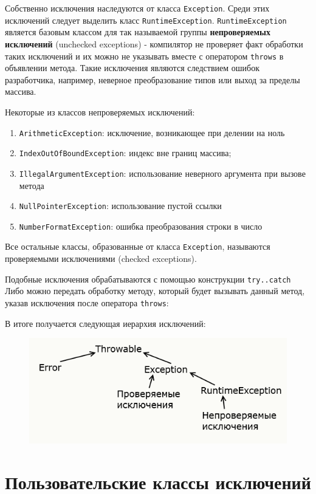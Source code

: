 \documentclass{report}
\begin{document}
Собственно исключения наследуются от класса \verb|Exception|. Среди этих исключений следует выделить класс \verb|RuntimeException|. \verb|RuntimeException| является базовым классом для так называемой группы \textbf{непроверяемых исключений} (unchecked exceptions) - компилятор не проверяет факт обработки таких исключений и их можно не указывать вместе с оператором \verb|throws| в объявлении метода. Такие исключения являются следствием ошибок разработчика, например, неверное преобразование типов или выход за пределы массива.

Некоторые из классов непроверяемых исключений:
\begin{enumerate}
    \item \verb|ArithmeticException|: исключение, возникающее при делении на ноль
    \item \verb|IndexOutOfBoundException|: индекс вне границ массива;
    \item \verb|IllegalArgumentException|: использование неверного аргумента при вызове метода
    \item \verb|NullPointerException|: использование пустой ссылки
    \item \verb|NumberFormatException|: ошибка преобразования строки в число
\end{enumerate}

Все остальные классы, образованные от класса \verb|Exception|, называются проверяемыми исключениями (checked exceptions).

Подобные исключения обрабатываются с помощью конструкции \verb|try..catch| Либо можно передать обработку методу, который будет вызывать данный метод, указав исключения после оператора \verb|throws|:

В итоге получается следующая иерархия исключений:

\begin{figure}[h]
\centering
\includegraphics[width=0.8\linewidth]{pic23-1.png}
\label{fig:mpr}
\end{figure}

\section{Пользовательские классы исключений}
\end{document}
